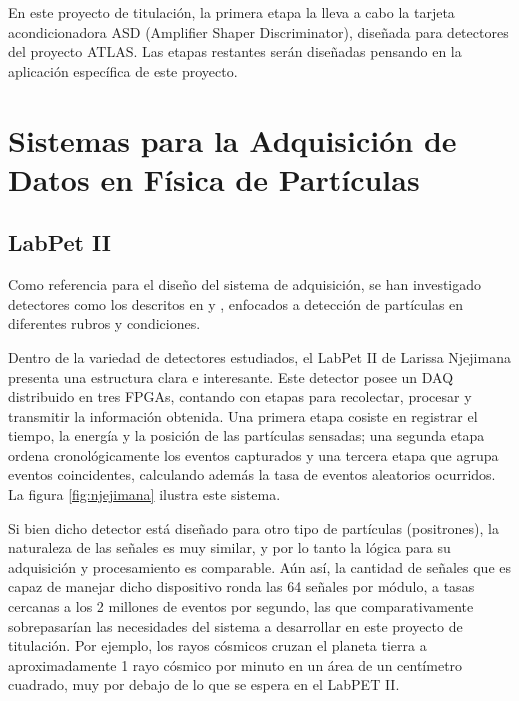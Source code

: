 	\par En este proyecto de titulación, la primera etapa la lleva a cabo la tarjeta acondicionadora ASD (Amplifier Shaper Discriminator), diseñada para detectores del proyecto ATLAS. Las etapas restantes serán diseñadas pensando en la aplicación específica de este proyecto.

\newpage
\section{Sistemas para la Adquisición de Datos en Física de Partículas}

\subsection{LabPet II}

\par Como referencia para el diseño del sistema de adquisición, se han investigado detectores como los descritos en \cite{Basiladze2017Methods1} y \cite{Basiladze2017Methods2}, enfocados a detección de partículas en diferentes rubros y condiciones.
\par Dentro de la variedad de detectores estudiados, el LabPet II de Larissa Njejimana \cite{Njejimana2013DesignImaging} presenta una estructura clara e interesante. Este detector posee un DAQ distribuido en tres FPGAs, contando con etapas para recolectar, procesar y transmitir la información obtenida. Una primera etapa cosiste en registrar el tiempo, la energía y la posición de las partículas sensadas; una segunda etapa ordena cronológicamente los eventos capturados y una tercera etapa que agrupa eventos coincidentes, calculando además la tasa de eventos aleatorios ocurridos. La figura \ref{fig:njejimana} ilustra este sistema.

\par Si bien dicho detector está diseñado para otro tipo de partículas (positrones), la naturaleza de las señales es muy similar, y por lo tanto la lógica para su adquisición y procesamiento es comparable. Aún así, la cantidad de señales que es capaz de manejar dicho dispositivo ronda las 64 señales por módulo, a tasas cercanas a los 2 millones de eventos por segundo, las que comparativamente sobrepasarían las necesidades del sistema a desarrollar en este proyecto de titulación. Por ejemplo, los rayos cósmicos cruzan el planeta tierra a aproximadamente 1 rayo cósmico por minuto en un área de un centímetro cuadrado, muy por debajo de lo que se espera en el LabPET II.

